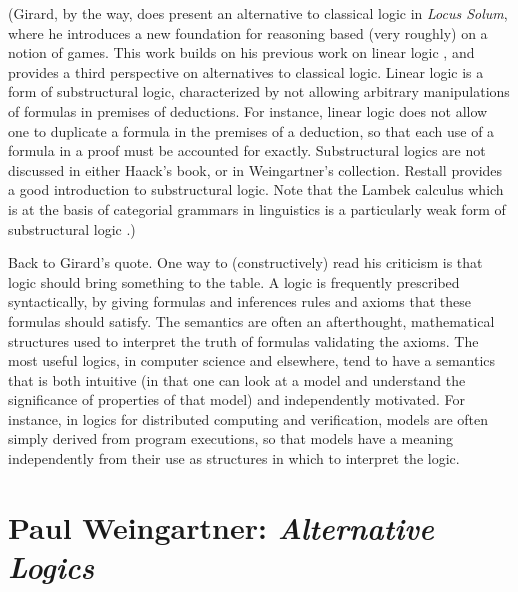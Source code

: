 \documentclass[11pt]{article}
\newcommand{\<}{\langle}
\renewcommand{\>}{\rangle}
\begin{document}
(Girard, by the way, does present an alternative to classical logic in
\emph{Locus Solum}, where he introduces a new foundation for reasoning
based (very roughly) on a notion of games.  
This work builds on his previous work on linear logic \cite{r:girard87,r:girard88}, and
provides a third perspective on alternatives to classical logic. 
Linear logic is a form of substructural logic,  characterized
by not allowing arbitrary manipulations of formulas in premises of
deductions. 
For instance, linear logic does not allow one to duplicate a formula
in the premises of a deduction, so that each use of a formula in a
proof must be accounted for exactly. 
Substructural logics are not discussed in either Haack's book, or in
Weingartner's collection. Restall \cite{r:restall00} provides a  good
introduction to substructural logic. 
Note that the Lambek calculus which is at the basis of categorial
grammars in linguistics is a particularly weak form of substructural
logic \cite{r:lambek58,r:carpenter97}.)

Back to Girard's quote. One way to (constructively) read his criticism 
is that logic should bring something to the table. 
A logic is frequently prescribed syntactically, by giving formulas and
inferences rules and axioms that these formulas should satisfy. 
The semantics are often an afterthought, mathematical structures used
to interpret the truth of formulas validating the axioms.
The most useful logics, in computer science and elsewhere, tend to have
a semantics that is both intuitive (in that one can look at a model
and understand the significance of properties of that model) and
independently motivated. 
For instance, in logics for distributed computing and verification,
models are often simply derived from program executions, so that
models have a meaning independently from their use as structures in
which to interpret the logic. 


\section*{Paul Weingartner: \emph{Alternative Logics}}
\end{document}
